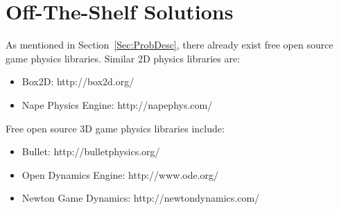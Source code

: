 \documentclass[12pt]{article}
\begin{document}
\section{Off-The-Shelf Solutions}
\label{Sec:ExistingSolns}
As mentioned in Section~\ref{Sec:ProbDesc}, there already exist free open source game physics libraries. Similar 2D physics libraries are:
\begin{itemize}
\item{Box2D: http://box2d.org/}
\item{Nape Physics Engine: http://napephys.com/}
\end{itemize}
Free open source 3D game physics libraries include:
\begin{itemize}
\item{Bullet: http://bulletphysics.org/}
\item{Open Dynamics Engine: http://www.ode.org/}
\item{Newton Game Dynamics: http://newtondynamics.com/}
\end{itemize}
\end{document}
